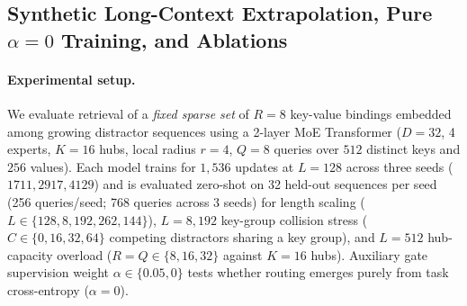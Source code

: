 \documentclass[11pt]{article}
\begin{document}
\subsection{Synthetic Long-Context Extrapolation, Pure \texorpdfstring{$\alpha=0$}{alpha=0} Training, and Ablations}
\label{sec:exp-synth}

\paragraph{Experimental setup.}
We evaluate retrieval of a \emph{fixed sparse set} of $R=8$ key-value bindings embedded among growing distractor sequences using a 2-layer MoE Transformer ($D=32$, 4 experts, $K=16$ hubs, local radius $r=4$, $Q=8$ queries over $512$ distinct keys and $256$ values). Each model trains for $1{,}536$ updates at $L=128$ across three seeds ($1711, 2917, 4129$) and is evaluated zero-shot on 32 held-out sequences per seed (256 queries/seed; 768 queries across 3 seeds) for length scaling ($L \in \{128, 8{,}192, 262{,}144\}$), $L=8{,}192$ key-group collision stress ($C \in \{0,16,32,64\}$ competing distractors sharing a key group), and $L=512$ hub-capacity overload ($R=Q \in \{8,16,32\}$ against $K=16$ hubs). Auxiliary gate supervision weight $\alpha \in \{0.05, 0\}$ tests whether routing emerges purely from task cross-entropy ($\alpha=0$).
\end{document}
